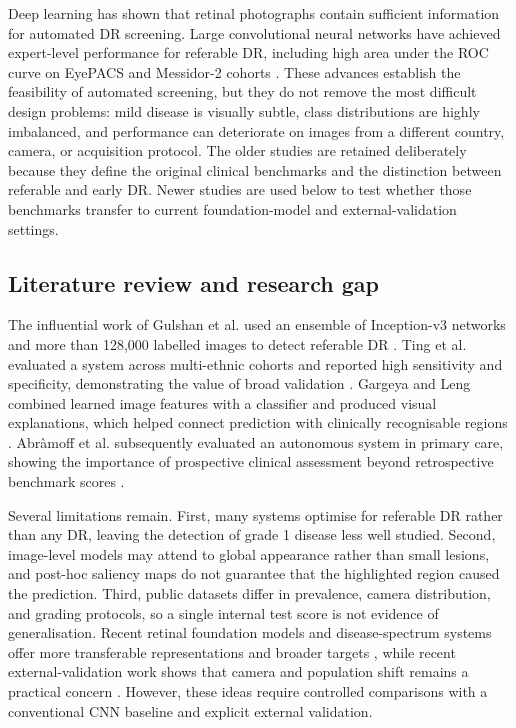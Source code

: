 \documentclass[11pt,a4paper]{article}
\begin{document}
Deep learning has shown that retinal photographs contain sufficient information for automated DR screening. Large convolutional neural networks have achieved expert-level performance for referable DR, including high area under the ROC curve on EyePACS and Messidor-2 cohorts \cite{gulshan2016,ting2017,gargeya2017}. These advances establish the feasibility of automated screening, but they do not remove the most difficult design problems: mild disease is visually subtle, class distributions are highly imbalanced, and performance can deteriorate on images from a different country, camera, or acquisition protocol.
The older studies are retained deliberately because they define the original clinical benchmarks and the distinction between referable and early DR. Newer studies are used below to test whether those benchmarks transfer to current foundation-model and external-validation settings.

\subsection{Literature review and research gap}
The influential work of Gulshan et al. used an ensemble of Inception-v3 networks and more than 128,000 labelled images to detect referable DR \cite{gulshan2016}. Ting et al. evaluated a system across multi-ethnic cohorts and reported high sensitivity and specificity, demonstrating the value of broad validation \cite{ting2017}. Gargeya and Leng combined learned image features with a classifier and produced visual explanations, which helped connect prediction with clinically recognisable regions \cite{gargeya2017}. Abràmoff et al. subsequently evaluated an autonomous system in primary care, showing the importance of prospective clinical assessment beyond retrospective benchmark scores \cite{abramoff2018,abramoff2013}.

Several limitations remain. First, many systems optimise for referable DR rather than any DR, leaving the detection of grade 1 disease less well studied. Second, image-level models may attend to global appearance rather than small lesions, and post-hoc saliency maps do not guarantee that the highlighted region caused the prediction. Third, public datasets differ in prevalence, camera distribution, and grading protocols, so a single internal test score is not evidence of generalisation. Recent retinal foundation models and disease-spectrum systems offer more transferable representations and broader targets \cite{zhou2023,deepdr2021,deepdrplus2024}, while recent external-validation work shows that camera and population shift remains a practical concern \cite{crosscamera2022,validation2022}. However, these ideas require controlled comparisons with a conventional CNN baseline and explicit external validation.
\end{document}
